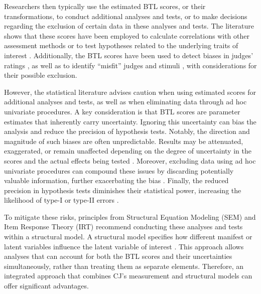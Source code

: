 \documentclass[
  authoryear,
  preprint,
  1p]{elsarticle}
\begin{document}
Researchers then typically use the estimated BTL scores, or their
transformations, to conduct additional analyses and tests, or to make
decisions regarding the exclusion of certain data in these analyses and
tests. The literature shows that these scores have been employed to
calculate correlations with other assessment methods
\citep{Goossens_et_al_2018, Bouwer_et_al_2023} or to test hypotheses
related to the underlying traits of interest
\citep{Bramley_et_al_2019, Boonen_et_al_2020, Bouwer_et_al_2023, vanDaal_et_al_2017, Jones_et_al_2019, Gijsen_et_al_2021}.
Additionally, the BTL scores have been used to detect biases in judges'
ratings \citep{Pollitt_et_al_2003, Pollitt_2012b}, as well as to
identify ``misfit'' judges and stimuli
\citep{Pollitt_2012b, vanDaal_et_al_2017, Goossens_et_al_2018}, with
considerations for their possible exclusion.

However, the statistical literature advises caution when using estimated
scores for additional analyses and tests, as well as when eliminating
data through ad hoc univariate procedures. A key consideration is that
BTL scores are parameter estimates that inherently carry uncertainty.
Ignoring this uncertainty can bias the analysis and reduce the precision
of hypothesis tests. Notably, the direction and magnitude of such biases
are often unpredictable. Results may be attenuated, exaggerated, or
remain unaffected depending on the degree of uncertainty in the scores
and the actual effects being tested
\citetext{\citealp[pp.~25]{Kline_et_al_2023}; \citealp[pp.~137]{Hoyle_et_al_2023}}.
Moreover, excluding data using ad hoc univariate procedures can compound
these issues by discarding potentially valuable information, further
exacerbating the bias \citep{Zimmerman_1994, McElreath_2020}. Finally,
the reduced precision in hypothesis tests diminishes their statistical
power, increasing the likelihood of type-I or type-II errors
\citep{McElreath_2020}.

To mitigate these risks, principles from Structural Equation Modeling
(SEM) \citep[pp.~138]{Hoyle_et_al_2023} and Item Response Theory (IRT)
\citetext{\citealp[chap.~6]{Fox_2010}; \citealp[chap.~24]{vanderLinden_et_al_2017_I}}
recommend conducting these analyses and tests within a structural model.
A structural model specifies how different manifest or latent variables
influence the latent variable of interest \citep{Everitt_et_al_2010}.
This approach allows analyses that can account for both the BTL scores
and their uncertainties simultaneously, rather than treating them as
separate elements. Therefore, an integrated approach that combines CJ's
measurement and structural models can offer significant advantages.
\end{document}
